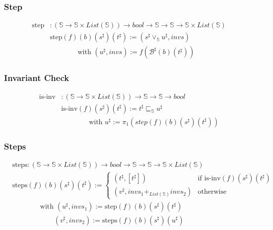 \documentclass[aspectratio=169]{beamer}
\begin{document}
\begin{frame}
    \frametitle{Step}
    \begin{align*}
        \text{step} &: (\mathbb{S} \to \mathbb{S} \times List(\mathbb{S})) \to bool \to \mathbb{S} \to \mathbb{S} \to \mathbb{S} \times List(\mathbb{S}) \\
        &\text{step} (f) (b) (s^{\sharp}) (t^{\sharp}) := (s^{\sharp} \vee_\mathbb{S} u^{\sharp}, invs)\\
        & \qquad \qquad \text{with } (u^{\sharp}, invs) := f (\mathcal{B}^{\sharp} (b) (t^{\sharp}))
    \end{align*}
\end{frame}

\begin{frame}
    \frametitle{Invariant Check}
    \begin{align*}
        \text{is-inv} &: (\mathbb{S} \to \mathbb{S} \times List(\mathbb{S}))  \to \mathbb{S} \to \mathbb{S} \to bool \\
        & \text{is-inv} (f) (s^{\sharp}) (t^{\sharp}) := t^{\sharp} \sqsubseteq_\mathbb{S} u^{\sharp} \\
        & \qquad \qquad \text{with } u^{\sharp} := \pi_1 (step (f) (b) (s^{\sharp}) (t^{\sharp}))
    \end{align*}
\end{frame}





        \begin{frame}
            \frametitle{Steps}
            \begin{align*}
                &\text{steps} : (\mathbb{S} \to \mathbb{S} \times List(\mathbb{S})) \to bool \to \mathbb{S} \to \mathbb{S} \to \mathbb{S} \times List(\mathbb{S}) \\
                &\text{steps} (f) (b) (s^{\sharp}) (t^{\sharp}) := \begin{cases}
                                                                (t^{\sharp}, [t^{\sharp}]) & \text{if } \text{is-inv} (f) (s^{\sharp}) (t^{\sharp}) \\
                                                                (v^{\sharp}, invs_1 +_{List(\mathbb{S})} invs_2) & \text{otherwise}
                                                            \end{cases} \\
            & \qquad \qquad \text{with } (u^{\sharp}, invs_1) := \text{step} (f) (b) (s^{\sharp}) (t^{\sharp}) \\
            & \qquad \qquad \qquad (v^{\sharp}, invs_2) := \text{steps} (f) (b) (s^{\sharp}) (u^{\sharp})
            \end{align*}
        \end{frame}
\end{document}
